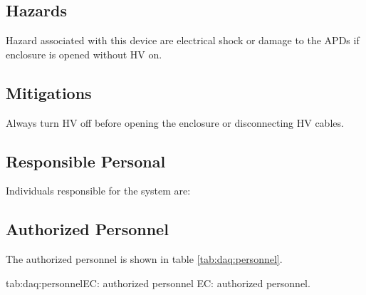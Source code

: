 {\subsection{Hazards} 
\indent

Hazard associated with this device are electrical shock or damage to the APDs if enclosure is opened without HV on.

\subsection{Mitigations}
\indent

Always turn HV off before opening the enclosure or disconnecting HV cables.

\subsection{Responsible Personal}
\indent

Individuals responsible for the system are:
\begin{safetyen}{10}{15}
\section{Authorized  Personnel} 
\end{safetyen}
The authorized personnel is shown in table \ref{tab:daq:personnel}.
\begin{namestab}{tab:daq:personnel}{EC: authorized personnel}{%
      EC: authorized personnel.}
\end{namestab}


}

